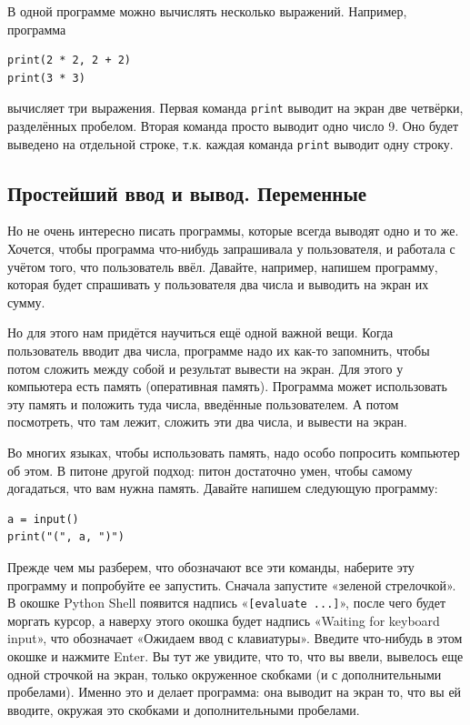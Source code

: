 В одной программе можно вычислять несколько выражений. Например, программа
\begin{verbatim}
print(2 * 2, 2 + 2)
print(3 * 3)
\end{verbatim}
вычисляет три выражения. Первая команда \verb`print` выводит на экран две четвёрки, разделённых 
пробелом. Вторая команда просто выводит одно число 9. Оно будет выведено на отдельной строке, т.к. каждая команда \verb`print` выводит одну строку.

\subsection{Простейший ввод и вывод. Переменные}

Но не очень интересно писать программы, которые всегда выводят одно и то же. Хочется, чтобы программа что-нибудь запрашивала у пользователя, и работала с учётом того, что пользователь ввёл. Давайте, например, напишем программу, которая будет спрашивать у пользователя два числа и выводить на экран их сумму.

Но для этого нам придётся научиться ещё одной важной вещи. Когда пользователь вводит два числа, программе надо их как-то запомнить, чтобы потом сложить между собой и результат вывести на экран. Для этого у компьютера есть память (оперативная память). Программа может использовать эту память и положить туда числа, введённые пользователем. А потом посмотреть, что там лежит, сложить эти два числа, и вывести на экран.

Во многих языках, чтобы использовать память, надо особо попросить компьютер об этом. В питоне другой подход:
питон достаточно умен, чтобы самому догадаться, что вам нужна память. Давайте напишем следующую программу:

\begin{verbatim}
a = input()
print("(", a, ")")
\end{verbatim}

Прежде чем мы разберем, что обозначают все эти команды, наберите эту программу и попробуйте ее запустить.
Сначала запустите «зеленой стрелочкой». В окошке Python Shell появится надпись «\verb`[evaluate ...]`»,
после чего будет моргать курсор, а наверху этого окошка будет надпись «Waiting for keyboard input»,
что обозначает «Ожидаем ввод с клавиатуры». Введите что-нибудь в этом окошке и нажмите Enter.
Вы тут же увидите, что то, что вы ввели, вывелось еще одной строчкой на экран,
только окруженное скобками (и с дополнительными пробелами).
Именно это и делает программа: она выводит на экран то, что вы ей вводите,
окружая это скобками и дополнительными пробелами.

